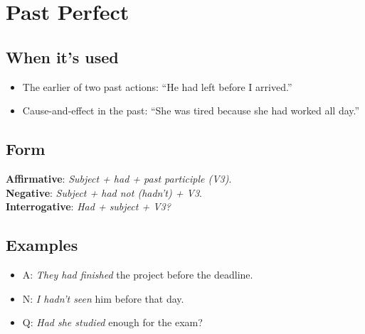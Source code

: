 \documentclass[11pt,a4paper]{article}
\begin{document}
\section{Past Perfect}
\subsection*{When it’s used}
\begin{itemize}
  \item The earlier of two past actions: ``He had left before I arrived.''
  \item Cause-and-effect in the past: ``She was tired because she had worked all day.''
\end{itemize}

\subsection*{Form}
\textbf{Affirmative}: \emph{Subject + had + past participle (V3)}.\\
\textbf{Negative}: \emph{Subject + had not (hadn’t) + V3}.\\
\textbf{Interrogative}: \emph{Had + subject + V3?}

\subsection*{Examples}
\begin{itemize}
  \item A: \emph{They had finished} the project before the deadline.
  \item N: \emph{I hadn’t seen} him before that day.
  \item Q: \emph{Had she studied} enough for the exam?
\end{itemize}
\end{document}

